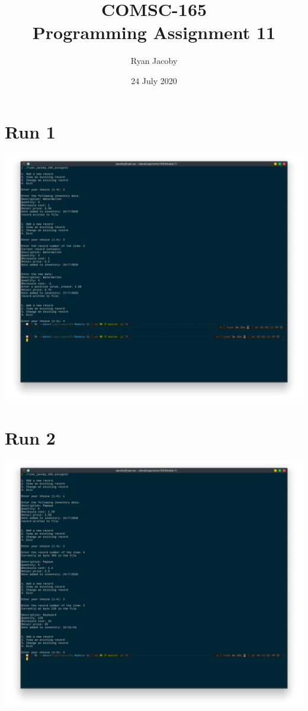 \documentclass[letterpaper, 11pt]{article}
\title{COMSC-165 \\ Programming Assignment 11}
\author{Ryan Jacoby}
\date{24 July 2020}
\begin{document}
\maketitle

\section*{Run 1}
\includegraphics[scale=0.5]{run1.png} 

\section*{Run 2}
\includegraphics[scale=0.5]{run2.png}
\end{document}
